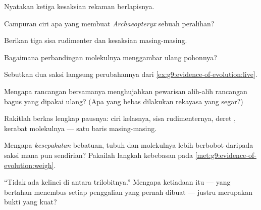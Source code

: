 \begin{exercise}[$\star$]\label{exo:g9:evidence-of-evolution:2}
Nyatakan ketiga kesaksian rekaman berlapisnya.
\end{exercise}

\begin{exercise}[$\star$]\label{exo:g9:evidence-of-evolution:3}
Campuran ciri apa yang membuat \emph{Archaeopteryx} sebuah
peralihan?
\end{exercise}

\begin{exercise}[$\star$]\label{exo:g9:evidence-of-evolution:4}
Berikan tiga sisa rudimenter dan kesaksian masing-masing.
\end{exercise}

\begin{exercise}[$\star$]\label{exo:g9:evidence-of-evolution:5}
Bagaimana perbandingan molekulnya menggambar ulang pohonnya?
\end{exercise}

\begin{exercise}[$\star$]\label{exo:g9:evidence-of-evolution:6}
Sebutkan dua saksi langsung perubahannya dari
\cref{ex:g9:evidence-of-evolution:live}.
\end{exercise}

\begin{exercise}[$\star\star$]\label{exo:g9:evidence-of-evolution:7}
Mengapa rancangan  bersamanya menghujahkan
pewarisan alih-alih rancangan bagus yang dipakai ulang? (Apa
yang bebas dilakukan rekayasa yang segar?)
\end{exercise}

\begin{exercise}[$\star\star$]\label{exo:g9:evidence-of-evolution:8}
Rakitlah berkas lengkap pausnya: ciri kelasnya, sisa
rudimenternya, deret , kerabat molekulnya --- satu
baris masing-masing.
\end{exercise}

\begin{exercise}[$\star\star$]\label{exo:g9:evidence-of-evolution:9}
Mengapa \emph{kesepakatan} bebatuan, tubuh dan molekulnya
lebih berbobot daripada saksi mana pun sendirian? Pakailah
langkah kebebasan pada
\cref{met:g9:evidence-of-evolution:weigh}.
\end{exercise}

\begin{exercise}[$\star\star$]\label{exo:g9:evidence-of-evolution:10}
``Tidak ada kelinci di antara trilobitnya.'' Mengapa
ketiadaan itu --- yang bertahan menembus setiap penggalian
yang pernah dibuat --- justru merupakan bukti yang kuat?
\end{exercise}

